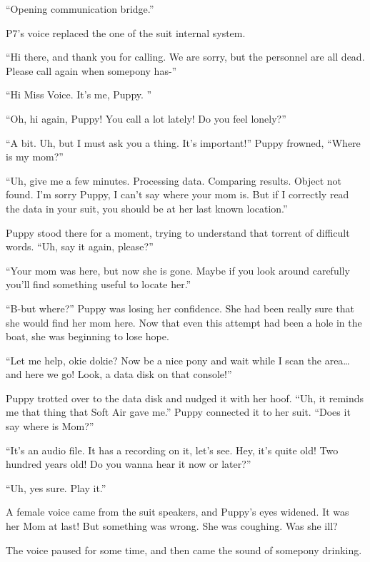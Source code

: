 {\mten ``Opening communication bridge.''}

P7's voice replaced the one of the suit internal system.

``Hi there, and thank you for calling. We are sorry, but the personnel are all dead. Please call again when somepony has-''

``Hi Miss Voice. It's me, Puppy. ''

``Oh, hi again, Puppy! You call a lot lately! Do you feel lonely?''

``A bit. Uh, but I must ask you a thing. It's important!'' Puppy frowned, ``Where is my mom?''

``Uh, give me a few minutes. Processing data. Comparing results. Object not found. I'm sorry Puppy, I can't say where your mom is. But if I correctly read the data in your suit, you should be at her last known location.''

Puppy stood there for a moment, trying to understand that torrent of difficult words. ``Uh, say it again, please?''

``Your mom was here, but now she is gone. Maybe if you look around carefully you'll find something useful to locate her.''

``B-but where?'' Puppy was losing her confidence. She had been really sure that she would find her mom here. Now that even this attempt had been a hole in the boat, she was beginning to lose hope.

``Let me help, okie dokie? Now be a nice pony and wait while I scan the area\dots and here we go! Look, a data disk on that console!''

Puppy trotted over to the data disk and nudged it with her hoof. ``Uh, it reminds me that thing that Soft Air gave me.'' Puppy connected it to her suit. ``Does it say where is Mom?''

``It's an audio file. It has a recording on it, let's see. Hey, it's quite old! Two hundred years old! Do you wanna hear it now or later?''

``Uh, yes sure. Play it.''

A female voice came from the suit speakers, and Puppy's eyes widened. It was her Mom at last! But something was wrong. She was coughing. Was she ill?


The voice paused for some time, and then came the sound of somepony drinking.

